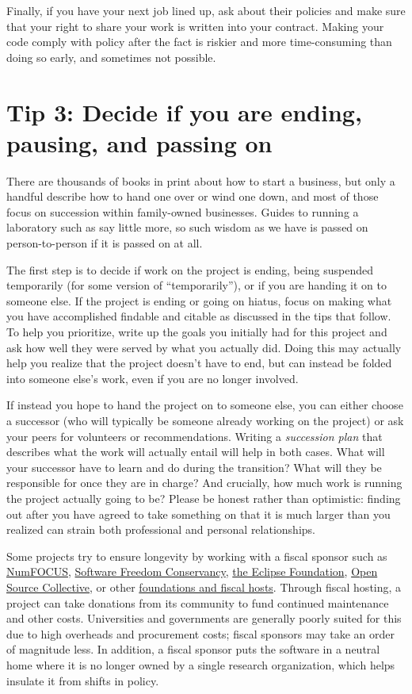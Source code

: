\documentclass[10pt,letterpaper]{article}
\begin{document}
Finally,
if you have your next job lined up,
ask about their policies
and make sure that your right to share your work is written into your contract.
Making your code comply with policy after the fact is riskier and more time-consuming than doing so early,
and sometimes not possible.

\section*{Tip 3: Decide if you are ending, pausing, and passing on}

There are thousands of books in print about how to start a business,
but only a handful describe how to hand one over or wind one down,
and most of those focus on succession within family-owned businesses.
Guides to running a laboratory such as \cite{Barker2010,Cohen2018} say little more,
so such wisdom as we have is passed on person-to-person if it is passed on at all.

The first step is to decide if work on the project is ending,
being suspended temporarily (for some version of ``temporarily''),
or if you are handing it on to someone else.
If the project is ending or going on hiatus,
focus on making what you have accomplished findable and citable
as discussed in the tips that follow.
To help you prioritize,
write up the goals you initially had for this project
and ask how well they were served by what you actually did.
Doing this may actually help you realize that the project doesn't have to end,
but can instead be folded into someone else's work,
even if you are no longer involved.

If instead you hope to hand the project on to someone else,
you can either choose a successor
(who will typically be someone already working on the project)
or ask your peers for volunteers or recommendations.
Writing a \emph{succession plan} that describes what the work will actually entail
will help in both cases.
What will your successor have to learn and do during the transition?
What will they be responsible for once they are in charge?
And crucially,
how much work is running the project actually going to be?
Please be honest rather than optimistic:
finding out after you have agreed to take something on
that it is much larger than you realized
can strain both professional and personal relationships.

Some projects try to ensure longevity by working with a fiscal sponsor such as
\href{https://numfocus.org/}{NumFOCUS},
\href{https://sfconservancy.org/}{Software Freedom Conservancy},
\href{https://www.eclipse.org/}{the Eclipse Foundation},
\href{https://oscollective.org/}{Open Source Collective},
or other \href{https://sustainoss.org/academic-map/organizations/index.html}{foundations and fiscal hosts}.
Through fiscal hosting,
a project can take donations from its community to fund continued maintenance and other costs.
Universities and governments are generally poorly suited for this due to high overheads and procurement costs;
fiscal sponsors may take an order of magnitude less.
In addition,
a fiscal sponsor puts the software in a neutral home
where it is no longer owned by a single research organization,
which helps insulate it from shifts in policy.
\end{document}

